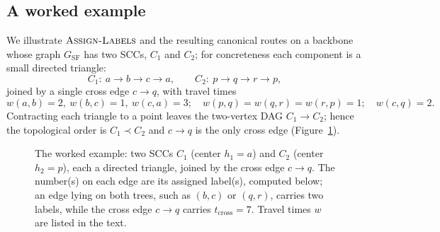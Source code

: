 \documentclass[11pt]{article}
\theoremstyle{definition}
\theoremstyle{remark}
\newcommand{\GSF}{G_{\mathrm{SF}}}
\begin{document}
\subsection{A worked example}\label{sec:example}

We illustrate $\textsc{Assign-Labels}$ and the resulting canonical routes on a backbone whose graph
$\GSF$ has two SCCs, $C_1$ and $C_2$;
for concreteness each component is a small directed triangle:
\[
  C_1:\ a\to b\to c\to a,\qquad C_2:\ p\to q\to r\to p,
\]
joined by a single cross edge $c\to q$, with travel times
\[
  w(a,b)=2,\ w(b,c)=1,\ w(c,a)=3;\quad w(p,q)=w(q,r)=w(r,p)=1;\quad w(c,q)=2 .
\]
Contracting each triangle to a point leaves the two-vertex DAG $C_1\to C_2$; hence the topological
order is $C_1\prec C_2$ and $c\to q$ is the only cross edge (Figure~\ref{fig:example}).

\begin{figure}[H]
\centering
{}
\caption{The worked example: two SCCs $C_1$ (center $h_1=a$) and $C_2$ (center $h_2=p$), each a
directed triangle, joined by the cross edge $c\to q$. The number(s) on each edge are its assigned
label(s), computed below; an edge lying on both trees, such as $(b,c)$ or $(q,r)$, carries two labels,
while the cross edge $c\to q$ carries $t_{\mathrm{cross}}=7$. Travel times $w$ are listed in the text.}
\label{fig:example}
\end{figure}
\end{document}

